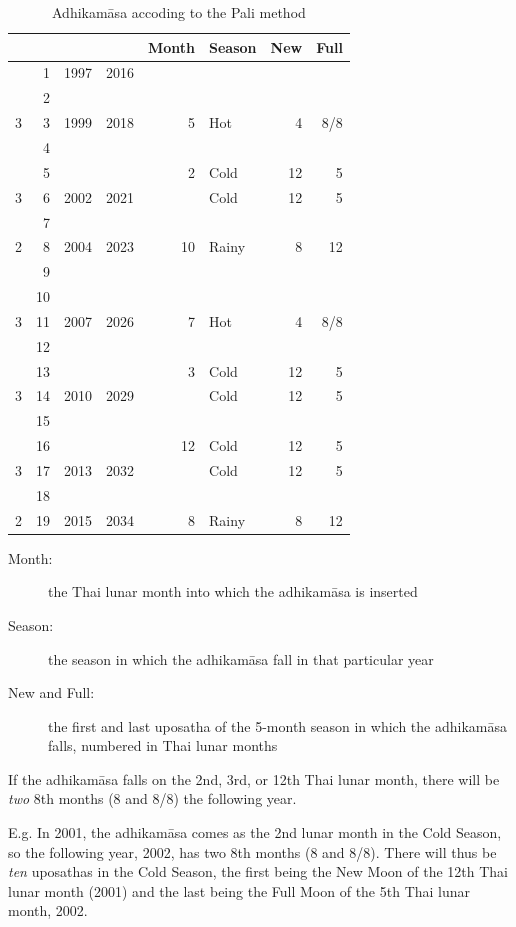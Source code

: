 \documentclass[11pt,oneside]{memoir-article}
\begin{document}
\begin{table}[htb]
\caption{\label{tbl-cycle-adhikamasa}Adhikamāsa accoding to the Pali method}
\centering
\begin{tabular}{rrrrrlrr}
 &  &  &  & Month & Season & New & Full\\
\hline
 & 1 & 1997 & 2016 &  &  &  & \\
 & 2 &  &  &  &  &  & \\
3 & 3 & 1999 & 2018 & 5 & Hot & 4 & 8/8\\
 & 4 &  &  &  &  &  & \\
 & 5 &  &  & 2 & Cold & 12 & 5\\
3 & 6 & 2002 & 2021 &  & Cold & 12 & 5\\
 & 7 &  &  &  &  &  & \\
2 & 8 & 2004 & 2023 & 10 & Rainy & 8 & 12\\
 & 9 &  &  &  &  &  & \\
 & 10 &  &  &  &  &  & \\
3 & 11 & 2007 & 2026 & 7 & Hot & 4 & 8/8\\
 & 12 &  &  &  &  &  & \\
 & 13 &  &  & 3 & Cold & 12 & 5\\
3 & 14 & 2010 & 2029 &  & Cold & 12 & 5\\
 & 15 &  &  &  &  &  & \\
 & 16 &  &  & 12 & Cold & 12 & 5\\
3 & 17 & 2013 & 2032 &  & Cold & 12 & 5\\
 & 18 &  &  &  &  &  & \\
2 & 19 & 2015 & 2034 & 8 & Rainy & 8 & 12\\
\end{tabular}
\end{table}

\begin{description}
\item[{Month:}] the Thai lunar month into which the adhikamāsa is inserted
\item[{Season:}] the season in which the adhikamāsa fall in that
particular year
\item[{New and Full:}] the first and last uposatha of the 5-month season
in which the adhikamāsa falls, numbered in Thai
lunar months
\end{description}

If the adhikamāsa falls on the 2nd, 3rd, or 12th Thai lunar month,
there will be \emph{two} 8th months (8 and 8/8) the following year.

E.g. In 2001, the adhikamāsa comes as the 2nd lunar month in the
Cold Season, so the following year, 2002, has two 8th months (8 and
8/8). There will thus be \emph{ten} uposathas in the Cold Season, the
first being the New Moon of the 12th Thai lunar month (2001) and the
last being the Full Moon of the 5th Thai lunar month, 2002.
\end{document}
